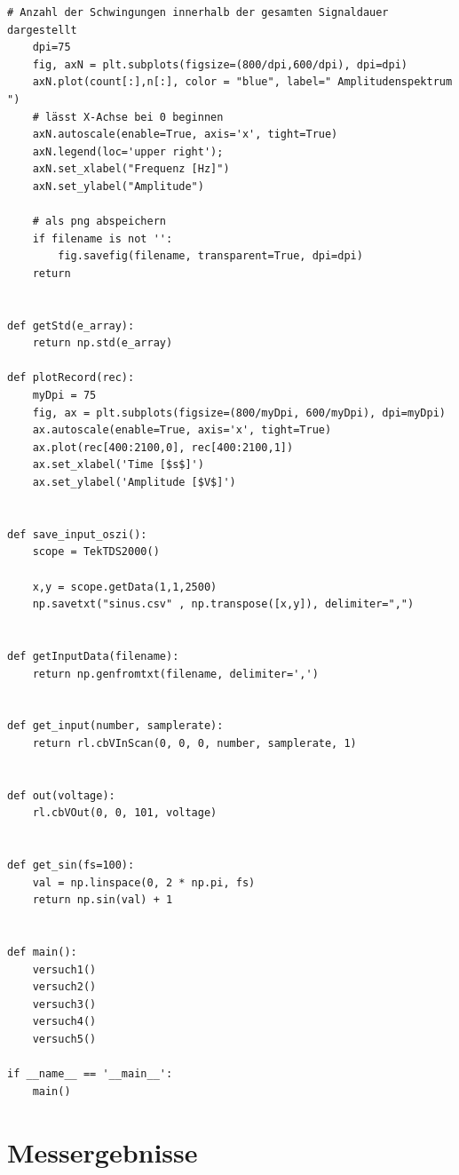 \documentclass[12pt,oneside,a4paper]{report}
\begin{document}
\begin{lstlisting}[style=PYTHON, frame=single, caption=QuellCodeV1 bis V4, captionpos=b, label=lst:Code]
    # Anzahl der Schwingungen innerhalb der gesamten Signaldauer dargestellt
    dpi=75
    fig, axN = plt.subplots(figsize=(800/dpi,600/dpi), dpi=dpi)
    axN.plot(count[:],n[:], color = "blue", label=" Amplitudenspektrum ")
    # lässt X-Achse bei 0 beginnen
    axN.autoscale(enable=True, axis='x', tight=True)
    axN.legend(loc='upper right');
    axN.set_xlabel("Frequenz [Hz]")
    axN.set_ylabel("Amplitude")
    
    # als png abspeichern    
    if filename is not '':
        fig.savefig(filename, transparent=True, dpi=dpi)
    return


def getStd(e_array):
    return np.std(e_array)

def plotRecord(rec):
    myDpi = 75
    fig, ax = plt.subplots(figsize=(800/myDpi, 600/myDpi), dpi=myDpi)
    ax.autoscale(enable=True, axis='x', tight=True)
    ax.plot(rec[400:2100,0], rec[400:2100,1])
    ax.set_xlabel('Time [$s$]')
    ax.set_ylabel('Amplitude [$V$]')


def save_input_oszi():
    scope = TekTDS2000()

    x,y = scope.getData(1,1,2500)
    np.savetxt("sinus.csv" , np.transpose([x,y]), delimiter=",")


def getInputData(filename):
    return np.genfromtxt(filename, delimiter=',')


def get_input(number, samplerate):
    return rl.cbVInScan(0, 0, 0, number, samplerate, 1)


def out(voltage):
    rl.cbVOut(0, 0, 101, voltage)


def get_sin(fs=100):
    val = np.linspace(0, 2 * np.pi, fs)
    return np.sin(val) + 1


def main():
    versuch1()
    versuch2()
    versuch3()
    versuch4()
    versuch5()

if __name__ == '__main__':
    main()
\end{lstlisting}

\section{Messergebnisse}
\label{chap:APPENDIX_MEASUREMENT_SOURCE}
\end{document}
